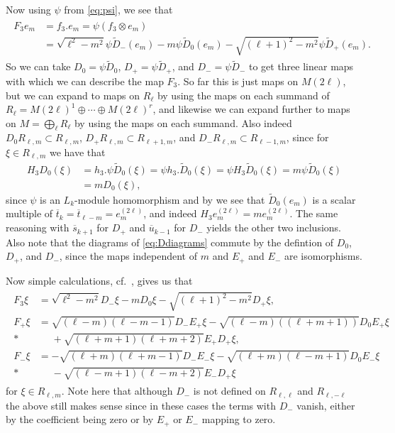 Now using $\psi$ from \cref{eq:psi}, we see that
\begin{align}\label{eq:F_3action}
  \begin{aligned}
    F_3e_m &= f_3 . e_m = \psi(f_3\otimes e_m) \\
    &= \sqrt{\ell^2-m^2}\psi \widetilde D_-(e_m) - m\psi \widetilde D_0(e_m) - \sqrt{(\ell+1)^2-m^2}\psi \widetilde D_+(e_m).
  \end{aligned}
\end{align}
So we can take $D_0=\psi\widetilde D_0$, $D_+ = \psi\widetilde D_+$, and $D_- = \psi\widetilde D_-$ to get three linear maps with which we can describe the map $F_3$. So far this is just maps on $M(2\ell)$, but we can expand to maps on $R_\ell$ by using the maps on each summand of $R_\ell=M(2\ell)^1 \oplus \dotsb \oplus M(2\ell)^r$, and likewise we can expand further to maps on $M=\bigoplus_\ell R_\ell$ by using the maps on each summand. Also indeed $D_0R_{\ell,m}\subset R_{\ell,m}$, $D_+R_{\ell,m}\subset R_{\ell+1,m}$, and $D_-R_{\ell,m}\subset R_{\ell-1,m}$, since for $\xi\in R_{\ell,m}$ we have that
\begin{align*}
  H_3D_0(\xi) &= h_3 . \psi\widetilde D_0(\xi) = \psi h_3 . \widetilde D_0(\xi) = \psi H_3 \widetilde D_0(\xi) = m\psi \widetilde D_0(\xi) \\
  &= m D_0(\xi),
\end{align*}
since $\psi$ is an $L_k$-module homomorphism and by  we see that $\widetilde D_0(e_m)$ is a scalar multiple of $\overline t_k = \overline t_{\ell-m} = e_m^{(2\ell)}$, and indeed $H_3e_m^{(2\ell)}=me_m^{(2\ell)}$. The same reasoning with $\overline s_{k+1}$ for $D_+$ and $\overline u_{k-1}$ for $D_-$ yields the other two inclusions. Also note that the diagrams of \cref{eq:Ddiagrams} commute by the defintion of $D_0$, $D_+$, and $D_-$, since the maps independent of $m$ and $E_+$ and $E_-$ are isomorphisms. 

Now simple calculations, cf.\ , gives us that
\begin{align}\label{eq:Factions}
  \begin{aligned}
    F_3 \xi &= \sqrt{\ell^2-m^2} D_-\xi - m D_0\xi - \sqrt{(\ell+1)^2-m^2}D_+\xi, \\
    F_+ \xi &= \sqrt{(\ell-m)(\ell-m-1)}D_-E_+\xi - \sqrt{(\ell-m)((\ell+m+1))}D_0E_+\xi \\*
    &\phantom{{}={}}{} + \sqrt{(\ell+m+1)(\ell+m+2)}E_+D_+\xi, \\
    F_- \xi &= -\sqrt{(\ell+m)(\ell+m-1)}D_-E_-\xi - \sqrt{(\ell+m)(\ell-m+1)}D_0E_-\xi \\*
    &\phantom{{}={}}{} - \sqrt{(\ell-m+1)(\ell-m+2)}E_-D_+\xi
  \end{aligned}
\end{align}
for $\xi\in R_{\ell,m}$. Note here that although $D_-$ is not defined on $R_{\ell,\ell}$ and $R_{\ell,-\ell}$ the above still makes sense since in these cases the terms with $D_-$ vanish, either by the coefficient being zero or by $E_+$ or $E_-$ mapping to zero.

